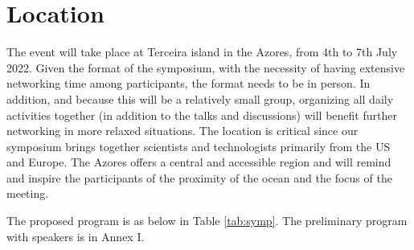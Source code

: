 \section{Location}

The event will take place at Terceira island in the Azores, from 4th to
7th July 2022. Given the format of the symposium, with the necessity of
having extensive networking time among participants, the format needs to
be in person. In addition, and because this will be a relatively small
group, organizing all daily activities together (in addition to the
talks and discussions) will benefit further networking in more relaxed
situations. The location is critical since our symposium brings together
scientists and technologists primarily from the US and Europe. The
Azores offers a central and accessible region and will remind and
inspire the participants of the proximity of the ocean and the focus of
the meeting.

The proposed program is as below in Table \ref{tab:symp}. The
preliminary program with speakers is in Annex I.

